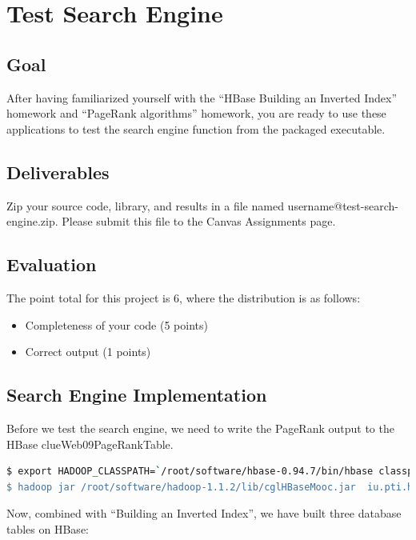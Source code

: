 \section*{Test Search Engine}
\subsection*{Goal}
After having familiarized yourself with the ``HBase Building an Inverted
Index'' homework and ``PageRank algorithms'' homework, you are ready to use
these applications to test the search engine function from the packaged
executable.

\subsection*{Deliverables}
Zip your source code, library, and results in a file named
username@test-search-engine.zip. Please submit this file to the Canvas
Assignments page.

\subsection*{Evaluation}
The point total for this project is 6, where the distribution is as follows:
\begin{itemize}
\item Completeness of your code (5 points)
\item Correct output (1 points)
\end{itemize}

\subsection*{Search Engine Implementation}
Before we test the search engine, we need to write the PageRank output to the
HBase clueWeb09PageRankTable.

\begin{lstlisting}[language=bash]
$ export HADOOP_CLASSPATH=`/root/software/hbase-0.94.7/bin/hbase classpath'
$ hadoop jar /root/software/hadoop-1.1.2/lib/cglHBaseMooc.jar  iu.pti.hbaseapp.clueweb09.PageRankTableLoader  /root/MoocHomeworks/HBaseInvertedIndexing/resources/en0000-01and02.docToNodeIdx.txt  /root/MoocHomeworks/HBaseInvertedIndexing/resources/en0000-01and02_reset_idx_and_square_pagerank.out
\end{lstlisting}

Now, combined with ``Building an Inverted Index'', we have built three database
tables on HBase:

